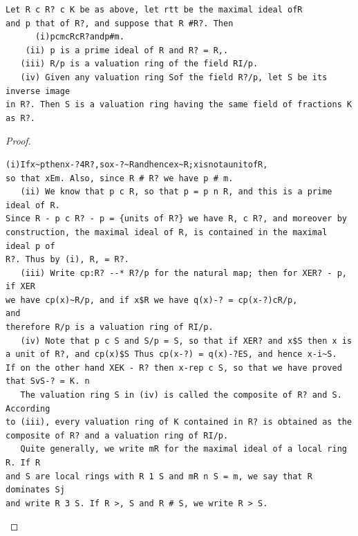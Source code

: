 \begin{theorem}\label{mcrt-auto-theorem-10-1}\uses{}
\begin{verbatim}
Let R c R? c K be as above, let rtt be the maximal ideal ofR
and p that of R?, and suppose that R #R?. Then
      (i)pcmcRcR?andp#m.
    (ii) p is a prime ideal of R and R? = R,.
   (iii) R/p is a valuation ring of the field RI/p.
   (iv) Given any valuation ring Sof the field R?/p, let S be its inverse image
in R?. Then S is a valuation ring having the same field of fractions K as R?.
\end{verbatim}
\end{theorem}
\begin{proof}
\begin{verbatim}
(i)Ifx~pthenx-?4R?,sox-?~Randhencex~R;xisnotaunitofR,
so that xEm. Also, since R # R? we have p # m.
   (ii) We know that p c R, so that p = p n R, and this is a prime ideal of R.
Since R - p c R? - p = {units of R?} we have R, c R?, and moreover by
construction, the maximal ideal of R, is contained in the maximal ideal p of
R?. Thus by (i), R, = R?.
   (iii) Write cp:R? --* R?/p for the natural map; then for XER? - p, if XER
we have cp(x)~R/p, and if x$R we have q(x)-? = cp(x-?)cR/p,                 and
therefore R/p is a valuation ring of RI/p.
   (iv) Note that p c S and S/p = S, so that if XER? and x$S then x is
a unit of R?, and cp(x)$S Thus cp(x-?) = q(x)-?ES, and hence x-i~S.
If on the other hand XEK - R? then x-rep c S, so that we have proved
that SvS-? = K. n
   The valuation ring S in (iv) is called the composite of R? and S. According
to (iii), every valuation ring of K contained in R? is obtained as the
composite of R? and a valuation ring of RI/p.
   Quite generally, we write mR for the maximal ideal of a local ring R. If R
and S are local rings with R 1 S and mR n S = m, we say that R dominates Sj
and write R 3 S. If R >, S and R # S, we write R > S.
\end{verbatim}
\end{proof}


